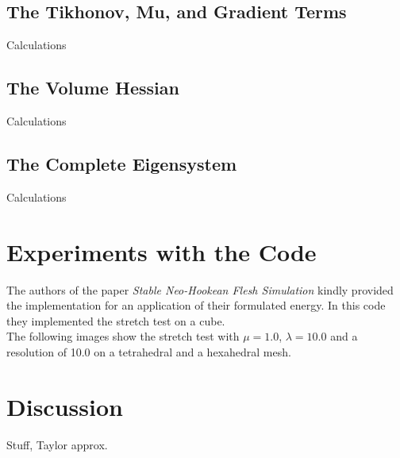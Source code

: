 \subsection{The Tikhonov, Mu, and Gradient Terms}
Calculations

\subsection{The Volume Hessian}
Calculations
 
\subsection{The Complete Eigensystem}
Calculations

\section{Experiments with the Code}
The authors of the paper \textit{Stable Neo-Hookean Flesh Simulation} \cite{Smith:2018:SNF:3191713.3180491} kindly provided the implementation for an application of their formulated energy. In this code they implemented the stretch test on a cube. 
\\
The following images show the stretch test with $\mu = 1.0$, $\lambda = 10.0$ and a resolution of 10.0 on a tetrahedral and a hexahedral mesh.


\section{Discussion}
Stuff, Taylor approx.


